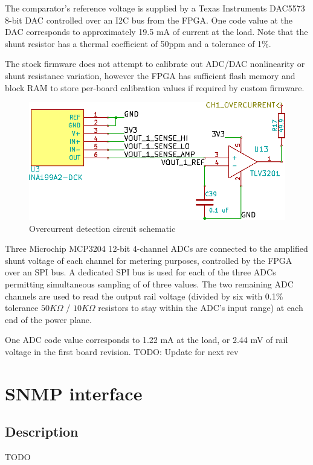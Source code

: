 \documentclass{article}
\begin{document}
The comparator's reference voltage is supplied by a Texas Instruments DAC5573 8-bit DAC controlled over an I2C bus 
from the FPGA. One code value at the DAC corresponds to approximately 19.5 mA of current at the load. Note that the 
shunt resistor has a thermal coefficient of 50ppm and a tolerance of 1\%.

The stock firmware does not attempt to calibrate out ADC/DAC nonlinearity or shunt resistance variation, however the
FPGA has sufficient flash memory and block RAM to store per-board calibration values if required by custom firmware.

\begin{figure}[h!]
\includegraphics[scale=0.25]{output-stage-2.png}
\caption{Overcurrent detection circuit schematic}
\label{output-stage-2}
\end{figure}

Three Microchip MCP3204 12-bit 4-channel ADCs are connected to the amplified shunt voltage of each channel for metering
purposes, controlled by the FPGA over an SPI bus. A dedicated SPI bus is used for each of the three ADCs permitting
simultaneous sampling of of three values. The two remaining ADC channels are used to read the output rail voltage
(divided by six with 0.1\% tolerance $50K\Omega$ / $10K\Omega$ resistors to stay within the ADC's input range) at each
end of the power plane. 

One ADC code value corresponds to 1.22 mA at the load, or 2.44 mV of rail voltage in the first board revision. TODO: 
Update for next rev

\pagebreak
\section{SNMP interface}
\label{sec:snmp}

\subsection{Description}
TODO
\end{document}
